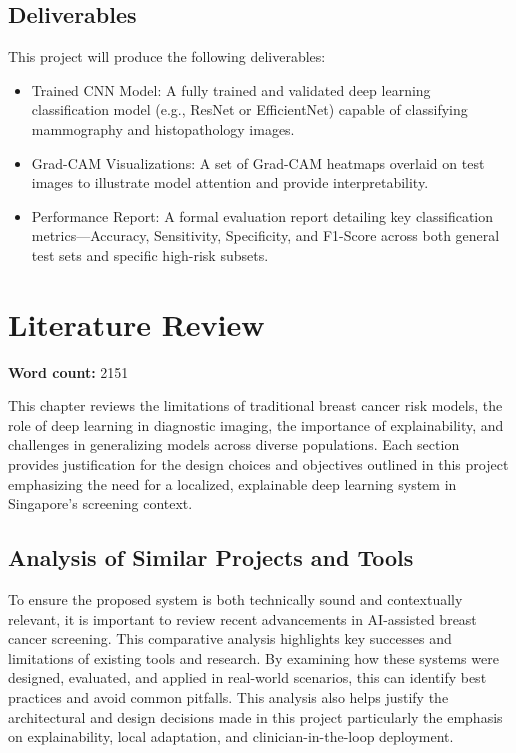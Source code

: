 \documentclass[12pt]{article}
\begin{document}
\subsection{Deliverables}
This project will produce the following deliverables:
\begin{itemize}
    \item {Trained CNN Model:} A fully trained and validated deep learning classification model (e.g., ResNet or EfficientNet) capable of classifying mammography and histopathology images.
    \item {Grad-CAM Visualizations:} A set of Grad-CAM heatmaps overlaid on test images to illustrate model attention and provide interpretability.
    \item {Performance Report:} A formal evaluation report detailing key classification metrics—{Accuracy, Sensitivity, Specificity, and F1-Score} across both general test sets and specific high-risk subsets.
\end{itemize}
\newpage

\newpage
\section{Literature Review}
\label{chapter2}
\noindent\textbf{Word count:} 2151
\vspace{2em}

This chapter reviews the limitations of traditional breast cancer risk models, the role of deep learning in diagnostic imaging, the importance of explainability, and challenges in generalizing models across diverse populations. Each section provides justification for the design choices and objectives outlined in this project emphasizing the need for a localized, explainable deep learning system in Singapore's screening context.

\subsection{Analysis of Similar Projects and Tools}

To ensure the proposed system is both technically sound and contextually relevant, it is important to review recent advancements in AI-assisted breast cancer screening. This comparative analysis highlights key successes and limitations of existing tools and research. By examining how these systems were designed, evaluated, and applied in real-world scenarios, this can identify best practices and avoid common pitfalls. This analysis also helps justify the architectural and design decisions made in this project particularly the emphasis on explainability, local adaptation, and clinician-in-the-loop deployment.
\end{document}
